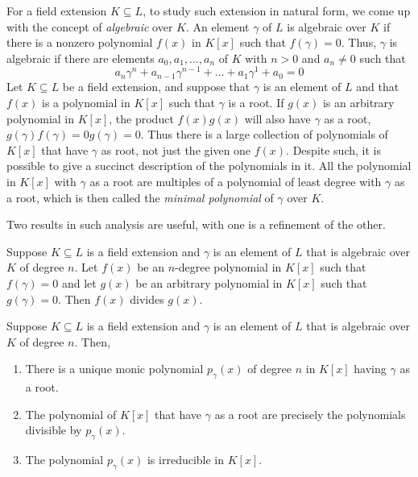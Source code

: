 For a field extension $K\subseteq L$, to study such extension in natural form, we come up with the concept of \textit{algebraic} over $K$. An element $\gamma$ of $L$ is algebraic over $K$ if there is a nonzero polynomial $f(x)$ in $K[x]$ such that $f(\gamma)=0$. Thus, $\gamma$ is algebraic if there are elements $a_0, a_{1},\dots,a_{n}$ of $K$ with $n>0$ and $a_{n}\neq 0$ such that 
\begin{equation}
    a_{n}\gamma^{n} + a_{n-1}\gamma^{n-1} + \dots + a_{1}\gamma^{1} + a_{0} = 0
\end{equation}
Let $K\subseteq L$ be a field extension, and suppose that $\gamma$ is an element of $L$ and that $f(x)$ is a polynomial in $K[x]$ such that $\gamma$ is a root. If $g(x)$ is an arbitrary polynomial in $K[x]$, the product $f(x)g(x)$ will also have $\gamma$ as a root, $g(\gamma)f(\gamma)=0g(\gamma)=0$. Thus there is a large collection of polynomials of $K[x]$ that have $\gamma$ as root, not just the given one $f(x)$. Despite such, it is possible to give a succinct description of the polynomials in it. All the polynomial in $K[x]$ with $\gamma$ as a root are multiples of a polynomial of least degree with $\gamma$ as a root, which is then called the \textit{minimal polynomial} of $\gamma$ over $K$. 

Two results in such analysis are useful, with one is a refinement of the other. 
\begin{theorem}
    Suppose $K\subseteq L$ is a field extension and $\gamma$ is an element of $L$ that is algebraic over $K$ of degree $n$. Let $f(x)$ be an $n$-degree polynomial in $K[x]$ such that $f(\gamma)=0$ and let $g(x)$ be an arbitrary polynomial in $K[x]$ such that $g(\gamma)=0$. Then $f(x)$ divides $g(x)$. 
\end{theorem}

\begin{theorem}
    Suppose $K\subseteq L$ is a field extension and $\gamma$ is an element of $L$ that is algebraic over $K$ of degree $n$. Then, 
    \begin{enumerate}[leftmargin = 2cm, topsep = 1pt, itemsep = 1pt]
        \item There is a unique monic polynomial $p_{\gamma}(x)$ of degree $n$ in $K[x]$ having $\gamma$ as a root. 
        \item The polynomial of $K[x]$ that have $\gamma$ as a root are precisely the polynomials divisible by $p_{\gamma}(x)$. 
        \item The polynomial $p_{\gamma}(x)$ is irreducible in $K[x]$. 
    \end{enumerate}
\end{theorem}
